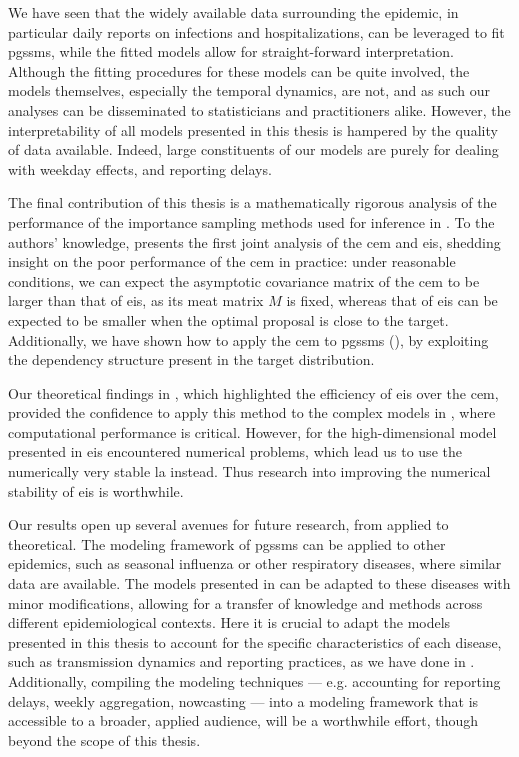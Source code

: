 We have seen that the widely available data surrounding the epidemic, in particular daily reports on infections and hospitalizations, can be leveraged to fit \glspl{pgssm}, while the fitted models allow for straight-forward interpretation. Although the fitting procedures for these models can be quite involved, the models themselves, especially the temporal dynamics, are not, and as such our analyses can be disseminated to statisticians and practitioners alike. However, the interpretability of all models presented in this thesis is hampered by the quality of data available. Indeed, large constituents of our models are purely for dealing with weekday effects, and reporting delays. 

The final contribution of this thesis is a mathematically rigorous analysis of the performance of the importance sampling methods used for inference in .
To the authors' knowledge,  presents the first joint analysis of the \gls{cem} and \gls{eis}, shedding insight on the poor performance of the \gls{cem} in practice: under reasonable conditions, we can expect the asymptotic covariance matrix of the \gls{cem} to be larger than that of \gls{eis}, as its meat matrix $M$ is fixed, whereas that of \gls{eis} can be expected to be smaller when the optimal proposal is close to the target. 
Additionally, we have shown how to apply the \gls{cem} to \glspl{pgssm} (), by exploiting the dependency structure present in the target distribution. 

Our theoretical findings in , which highlighted the efficiency of \gls{eis} over the \gls{cem}, provided the confidence to apply this method to the complex models in , where computational performance is critical. However, for the high-dimensional model presented in  \gls{eis} encountered numerical problems, which lead us to use the numerically very stable \gls{la} instead. Thus research into improving the numerical stability of \gls{eis} is worthwhile.

Our results open up several avenues for future research, from applied to theoretical. The modeling framework of \glspl{pgssm} can be applied to other epidemics, such as seasonal influenza or other respiratory diseases, where similar data are available. The models presented in  can be adapted to these diseases with minor modifications, allowing for a transfer of knowledge and methods across different epidemiological contexts. Here it is crucial to adapt the models presented in this thesis to account for the specific characteristics of each disease, such as transmission dynamics and reporting practices, as we have done in . 
Additionally, compiling the modeling techniques --- e.g. accounting for reporting delays, weekly aggregation, nowcasting --- into a modeling framework 
that is accessible to a broader, applied audience, will be a worthwhile effort, though beyond the scope of this thesis.

